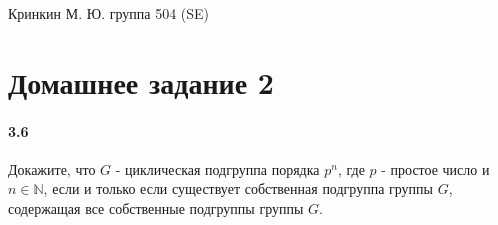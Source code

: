 \documentclass[a4paper,12pt]{article}
\begin{document}
\sloppy

\lstset{
	basicstyle=\small,
	stringstyle=\ttfamily,
	showstringspaces=false,
	columns=fixed,
	breaklines=true,
	numbers=right,
	numberstyle=\tiny
}

\newtheorem{Def}{Определение}[section]
\newtheorem{Th}{Теорема}
\newtheorem{Lem}[Th]{Лемма}
\newenvironment{Proof}
	{\par\noindent{\bf Доказательство.}}
	{\hfill$\scriptstyle\blacksquare$}
\newenvironment{Solution}
	{\par\noindent{\bf Решение.}}
	{\hfill$\scriptstyle\blacksquare$}


\begin{flushright}
	Кринкин М. Ю. группа 504 (SE)
\end{flushright}

\section{Домашнее задание 2}

\paragraph{3.6} Докажите, что $G$ - циклическая подгруппа порядка $p^n$, где $p$ - простое число и $n \in \mathbb{N}$, если и только если существует собственная подгруппа группы $G$, содержащая все собственные подгруппы группы $G$.
\end{document}

